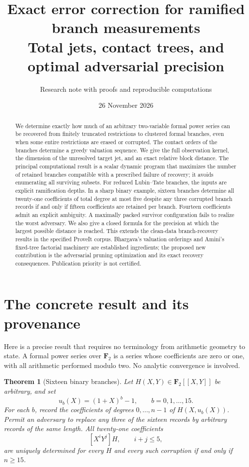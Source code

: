 \documentclass[11pt]{article}
\title{\textbf{Exact error correction for ramified branch measurements}\\[5pt]
\large Total jets, contact trees, and optimal adversarial precision}
\author{Research note with proofs and reproducible computations}
\date{26 November 2026}
\newtheorem{theorem}{Theorem}[section]
\theoremstyle{definition}
\newcommand{\F}{\mathbf F}
\begin{document}
\maketitle
\thispagestyle{empty}
\begin{abstract}
We determine exactly how much of an arbitrary two-variable formal power series can be recovered from finitely truncated restrictions to clustered formal branches, even when some entire restrictions are erased or corrupted. The contact orders of the branches determine a greedy valuation sequence. We give the full observation kernel, the dimension of the unresolved target jet, and an exact relative block distance. The principal computational result is a scalar dynamic program that maximizes the number of retained branches compatible with a prescribed failure of recovery; it avoids enumerating all surviving subsets. For reduced Lubin--Tate branches, the inputs are explicit ramification depths. In a sharp binary example, sixteen branches determine all twenty-one coefficients of total degree at most five despite any three corrupted branch records if and only if fifteen coefficients are retained per branch. Fourteen coefficients admit an explicit ambiguity. A maximally packed survivor configuration fails to realize the worst adversary. We also give a closed formula for the precision at which the largest possible distance is reached. This extends the clean-data branch-recovery results in the specified ProveIt corpus. Bhargava's valuation orderings and Amini's fixed-tree factorial machinery are established ingredients; the proposed new contribution is the adversarial pruning optimization and its exact recovery consequences. Publication priority is not certified.
\end{abstract}

\section{The concrete result and its provenance}

Here is a precise result that requires no terminology from arithmetic geometry to state. A formal power series over $\F_2$ is a series whose coefficients are zero or one, with all arithmetic performed modulo two. No analytic convergence is involved.

\begin{theorem}[Sixteen binary branches]\label{thm:headline}
Let $H(X,Y)\in\F_2[[X,Y]]$ be arbitrary, and set
\[
 u_b(X)=(1+X)^b-1,\qquad b=0,1,\ldots,15.
\]
For each $b$, record the coefficients of degrees $0,\ldots,n-1$ of $H(X,u_b(X))$. Permit an adversary to replace any three of the sixteen records by arbitrary records of the same length. All twenty-one coefficients
\[
 [X^iY^j]H,\qquad i+j\le5,
\]
are uniquely determined for every $H$ and every such corruption if and only if $n\ge15$.
\end{theorem}
\end{document}
